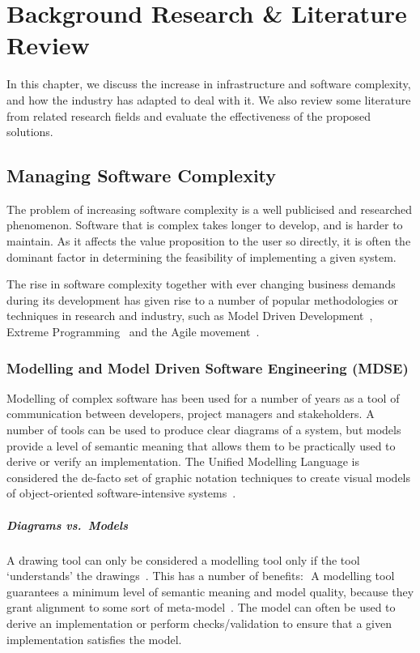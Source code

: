 \documentclass{cshonours}
\begin{document}
\chapter{Background Research \& Literature Review}

In this chapter, we discuss the increase in infrastructure and software complexity, and how the industry has adapted to deal with it. We also review some literature from related research fields and evaluate the effectiveness of the proposed solutions.

\section{Managing Software Complexity}

The problem of increasing software complexity is a well publicised and researched phenomenon. Software that is complex takes longer to develop, and is harder to maintain. As it affects the value proposition to the user so directly, it is often the dominant factor in determining the feasibility of implementing a given system.

The rise in software complexity together with ever changing business demands during its development has given rise to a number of popular methodologies or techniques in research and industry, such as Model Driven Development~\cite{MDD}, Extreme Programming~\cite{BeckXP} and the Agile movement~\cite{AgileManifesto}.

\subsection{Modelling and Model Driven Software Engineering (MDSE)}

Modelling of complex software has been used for a number of years as a tool of communication between developers, project managers and stakeholders. A number of tools can be used to produce clear diagrams of a system, but models provide a level of semantic meaning that allows them to be practically used to derive or verify an implementation. The Unified Modelling Language is considered the de-facto set of graphic notation techniques to create visual models of object-oriented software-intensive systems~\cite{UMLDefinition}.

\paragraph{Diagrams vs.\ Models}
A drawing tool can only be considered a modelling tool only if the tool `understands' the drawings~\cite[p.~11]{ModelDrivenDevelopment}. This has a number of benefits: 
A modelling tool guarantees a minimum level of semantic meaning and model quality, because they grant alignment to some sort of meta-model~\cite[p.~12]{ModelDrivenDevelopment}.
The model can often be used to derive an implementation or perform checks/validation to ensure that a given implementation satisfies the model. 
\end{document}
